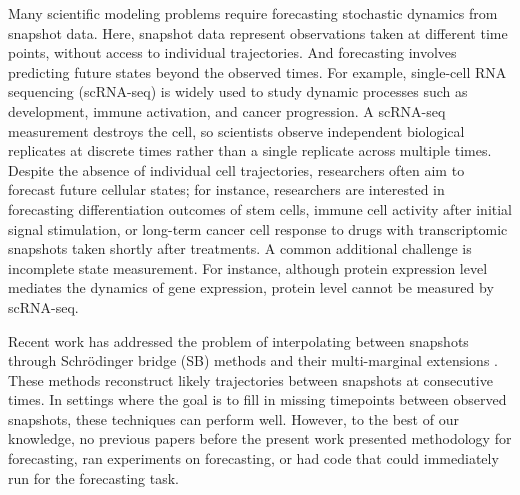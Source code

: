 Many scientific modeling problems require forecasting stochastic dynamics from snapshot data. Here, snapshot data represent observations taken at different time points, without access to individual trajectories. And forecasting involves predicting future states beyond the observed times. For example, single-cell RNA sequencing (scRNA-seq) is widely used to study dynamic processes such as development, immune activation, and cancer progression. A scRNA-seq measurement destroys the cell, so scientists observe independent biological replicates at discrete times rather than a single replicate across multiple times. Despite the absence of individual cell trajectories, researchers often aim to forecast future cellular states; for instance, researchers are interested in forecasting differentiation outcomes of stem cells, immune cell activity after initial signal stimulation, or long-term cancer cell response to drugs with transcriptomic snapshots taken shortly after treatments. A common additional challenge is incomplete state measurement. For instance, although protein expression level mediates the dynamics of gene expression, protein level cannot be measured by scRNA-seq. 

Recent work has addressed the problem of interpolating between snapshots through Schrödinger bridge (SB) methods \citep{pavon2021data,de2021diffusion,Vargas2021,koshizuka2022neural,Wang2023} and their multi-marginal extensions \citep{shen2024multi,zhang2024joint,guan2024identifying,chen2024deep,Lavenant2021}. These methods reconstruct likely trajectories between snapshots at consecutive times. %
In settings where the goal is to fill in missing timepoints between observed snapshots, these techniques can perform well. However, to the best of our knowledge, no previous papers before the present work presented methodology for forecasting, ran experiments on forecasting, or had code that could immediately run for the forecasting task.

